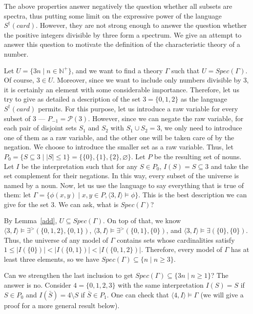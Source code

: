 \documentclass[12pt, reqno]{amsart}
\theoremstyle{definition}
\theoremstyle{remark}
\numberwithin{equation}{section}
\begin{document}
The above properties answer negatively the question whether all subsets are spectra, thus putting some limit on the expressive power of the language $S^{\dagger}(card)$. However, they are not strong enough to answer the question whether the positive integers divisible by three form a spectrum. We give an attempt to answer this question to motivate the definition of the characteristic theory of a number. 

Let $U = \{3n \mid n \in \mathbb{N}^+\}$, and we want to find a theory $\Gamma$ such that $U = Spec(\Gamma)$. Of course, $3 \in U$. Moreover, since we want to include only numbers divisible by $3$, it is certainly an element with some considerable importance. Therefore, let us try to give as detailed a description of the set $3=\{0,1,2\}$ as the language $S^\dagger(card)$ permits. For this purpose, let us introduce a raw variable for every subset of $3$ --- $P_{-1} = \mathcal{P}(3)$. However, since we can negate the raw variable, for each pair of disjoint sets $S_1$ and $S_2$ with $S_1 \cup S_2 = 3$, we only need to introduce one of them as a raw variable, and the other one will be taken care of by the negation. We choose to introduce the smaller set as a raw variable. Thus, let $P_{0} = \{S \subseteq 3 \mid |S| \leq 1\} = \{\{0\}, \{1\}, \{2\}, \varnothing\}$. Let $P$ be the resulting set of nouns. Let $I$ be the interpretation such that for any $S \in P_0$, $I(S) = S \subseteq 3$ and take the set complement for their negations. In this way, every subset of the universe is named by a noun. Now, let us use the language to say everything that is true of them: let $\Gamma = \{\phi(x, y) \mid x, y \in P, \langle 3, I\rangle \models \phi \}$. This is the best description we can give for the set $3$. We can ask, what is $Spec(\Gamma)$? 

By Lemma~\ref{add}, $U \subseteq Spec(\Gamma)$. On top of that, we know $\langle 3, I\rangle \models \exists^{>}(\{0, 1, 2\}, \{0, 1\})$, $\langle 3, I\rangle \models \exists^{>}(\{0, 1\}, \{0\})$, and $\langle 3, I\rangle \models \exists(\{0\},\{0\})$. Thus, the universe of any model of $\Gamma$ contains sets whose cardinalities satisfy $1\leq |I(\{0\})| < |I(\{0,1\})| < |I(\{0,1,2\})|.$ Therefore, every model of $\Gamma$ has at least three elements, so we have $Spec(\Gamma) \subseteq \{n \mid n \geq 3\}$. 

Can we strengthen the last inclusion to get $Spec(\Gamma) \subseteq \{3n \mid n \geq 1\}$? The answer is no. Consider $4 = \{0, 1, 2, 3\}$ with the same interpretation $I(S) = S$ if $S \in P_0$ and $I(\bar{S}) = 4 \setminus S$ if $\bar{S} \in P_1$. One can check that $ \langle 4, I\rangle \models \Gamma$ (we will give a proof for a more general result below). 
\end{document}
